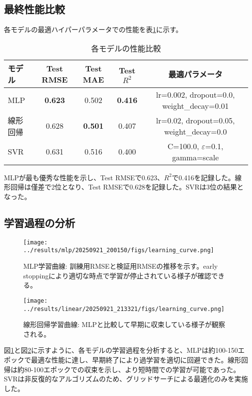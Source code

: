 \documentclass[12pt,a4paper,dvipdfmx]{jsarticle}
\begin{document}
\subsection{最終性能比較}

各モデルの最適ハイパーパラメータでの性能を表\ref{tab:performance}に示す。

\begin{table}[h]
\centering
\caption{各モデルの性能比較}
\label{tab:performance}
\begin{tabular}{lcccc}
\toprule
モデル & Test RMSE & Test MAE & Test $R^2$ & 最適パラメータ \\
\midrule
MLP & \textbf{0.623} & 0.502 & \textbf{0.416} & lr=0.002, dropout=0.0, weight\_decay=0.01 \\
線形回帰 & 0.628 & \textbf{0.501} & 0.407 & lr=0.02, dropout=0.05, weight\_decay=0.0 \\
SVR & 0.631 & 0.516 & 0.400 & C=100.0, $\varepsilon$=0.1, gamma=scale \\
\bottomrule
\end{tabular}
\end{table}

MLPが最も優秀な性能を示し、Test RMSEで0.623、$R^2$で0.416を記録した。線形回帰は僅差で2位となり、Test RMSEで0.628を記録した。SVRは3位の結果となった。

\subsection{学習過程の分析}

\begin{figure}[H]
\centering
\texttt{[image: ../results/mlp/20250921\_200150/figs/learning\_curve.png]}
\caption{MLP学習曲線: 訓練用RMSEと検証用RMSEの推移を示す。early stoppingにより適切な時点で学習が停止されている様子が確認できる。}
\label{fig:mlp_learning}
\end{figure}

\begin{figure}[H]
\centering
\texttt{[image: ../results/linear/20250921\_213321/figs/learning\_curve.png]}
\caption{線形回帰学習曲線: MLPと比較して早期に収束している様子が観察される。}
\label{fig:linear_learning}
\end{figure}

図\ref{fig:mlp_learning}と図\ref{fig:linear_learning}に示すように、各モデルの学習過程を分析すると、MLPは約100-150エポックで最適な性能に達し、早期終了により過学習を適切に回避できた。線形回帰は約80-100エポックでの収束を示し、より短時間での学習が可能であった。SVRは非反復的なアルゴリズムのため、グリッドサーチによる最適化のみを実施した。
\end{document}
